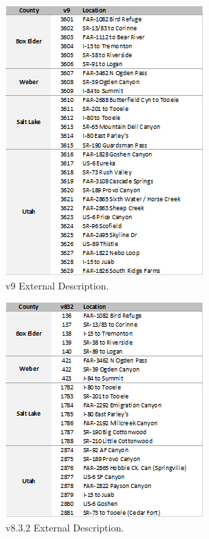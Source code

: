 \documentclass[
  letterpaper,
  DIV=11,
  numbers=noendperiod]{scrreprt}
\begin{document}
\begin{figure}[H]

{\centering \includegraphics{v9x/v900/whats-new/_pictures/ex_descrip1.png}

}

\caption{\label{fig-descrip1}v9 External Description.}

\end{figure}

\begin{figure}[H]

{\centering \includegraphics{v9x/v900/whats-new/_pictures/ex_descrip2.png}

}

\caption{\label{fig-descrip2}v8.3.2 External Description.}

\end{figure}
\end{document}
